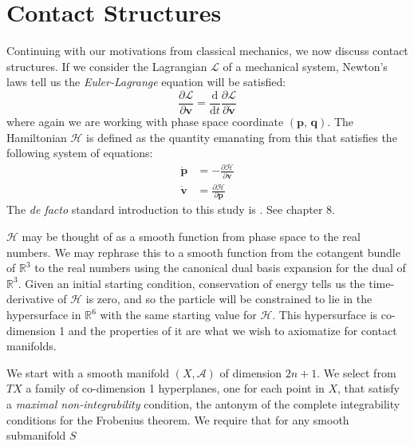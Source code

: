 \section{Contact Structures}
    Continuing with our motivations from classical mechanics, we now discuss
    contact structures. If we consider the Lagrangian $\mathcal{L}$ of a
    mechanical system, Newton's laws tell us the \textit{Euler-Lagrange}
    equation will be satisfied:
    \begin{equation}
        \frac{\partial\mathcal{L}}{\partial\mathbf{v}}
        =\frac{\textrm{d}}{\textrm{d}t}
        \frac{\partial\mathcal{L}}{\partial\dot{\mathbf{v}}}
    \end{equation}
    where again we are working with phase space coordinate
    $(\mathbf{p},\,\mathbf{q})$. The Hamiltonian $\mathcal{H}$ is defined as
    the quantity emanating from this that satisfies the following system of
    equations:
    \begin{align}
        \dot{\mathbf{p}}&=-\frac{\partial\mathcal{H}}{\partial\mathbf{v}}\\
        \dot{\mathbf{v}}&=\frac{\partial\mathcal{H}}{\partial\mathbf{p}}
    \end{align}
    The \textit{de facto} standard introduction to this study is
    \cite{GoldsteinClassicalMechanics}. See chapter 8.
    \par\hfill\par
    $\mathcal{H}$ may be thought of as a smooth function from phase space to
    the real numbers. We may rephrase this to a smooth function from the
    cotangent bundle of $\mathbb{R}^{3}$ to the real numbers using the
    canonical dual basis expansion for the dual of $\mathbb{R}^{3}$. Given an
    initial starting condition, conservation of energy tells us the
    time-derivative of $\mathcal{H}$ is zero, and so the particle will be
    constrained to lie in the hypersurface in $\mathbb{R}^{6}$ with the same
    starting value for $\mathcal{H}$. This hypersurface is co-dimension 1 and
    the properties of it are what we wish to axiomatize for contact manifolds.
    \par\hfill\par
    We start with a smooth manifold $(X,\mathcal{A})$ of dimension $2n+1$.
    We select from $TX$ a family of co-dimension 1 hyperplanes,
    one for each point in $X$,
    that satisfy a \textit{maximal non-integrability} condition,
    the antonym of the complete integrability conditions for the Frobenius
    theorem. We require that for any smooth submanifold $S$
